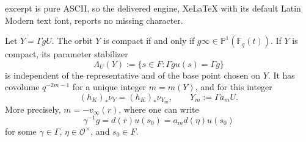\documentclass[10pt,a4paper]{amsart}
\newcommand{\Fq}{\mathbb F_q}
\newcommand{\cO}{\mathcal O}
\begin{document}
excerpt is pure ASCII, so the delivered engine, XeLaTeX with its default Latin Modern text font, reports no missing character.
\begin{proposition}
\label{prop:compact-normal-form}
Let \(Y=\Gamma gU\).  The orbit \(Y\) is compact if and only if
\(g\infty\in\mathbb P^1(\Fq(t))\).  If \(Y\) is compact, its parameter
stabilizer
\[
\Lambda_U(Y):=\{s\in F:\Gamma gu(s)=\Gamma g\}
\]
is independent of the representative and of the base point chosen on \(Y\).
It has covolume \(q^{-2m-1}\) for a unique integer \(m=m(Y)\), and for this
integer
\[
(h_K)_*\nu_Y=(h_K)_*\nu_{Y_m},
\qquad Y_m:=\Gamma a_mU.
\]
More precisely, \(m=-v_\infty(r)\), where one can write
\[
\gamma^{-1}g=d(r)u(s_0)=a_m d(\eta)u(s_0)
\]
for some \(\gamma\in\Gamma\), \(\eta\in\cO^\times\), and \(s_0\in F\).
\end{proposition}
\end{document}
